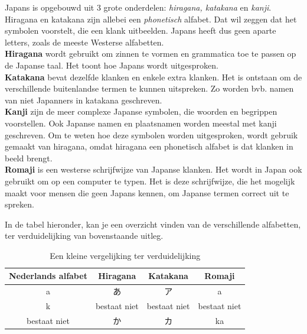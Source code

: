 \documentclass[12pt]{scrartcl}
\begin{document}
\begin{CJK*}{UTF8}{min}
\noindent Japans is opgebouwd uit 3 grote onderdelen: \textit{hiragana, katakana} en \textit{kanji}.\\

\noindent Hiragana en katakana zijn allebei een \textit{phonetisch} alfabet. Dat wil zeggen dat het symbolen voorstelt, die een klank uitbeelden.
Japans heeft dus geen aparte letters, zoals de meeste Westerse alfabetten.\\

\noindent \textbf{Hiragana} wordt gebruikt om zinnen te vormen en grammatica toe te passen op de Japanse taal. Het toont hoe Japans wordt uitgesproken.\\

\noindent \textbf{Katakana} bevat dezelfde klanken en enkele extra klanken. Het is ontstaan om de verschillende buitenlandse termen te kunnen uitspreken. Zo worden bvb. namen van niet Japanners in katakana geschreven.\\

\noindent \textbf{Kanji} zijn de meer complexe Japanse symbolen, die woorden en begrippen voorstellen. Ook Japanse namen en plaatsnamen worden meestal met kanji geschreven. Om te weten hoe deze symbolen worden uitgesproken, wordt gebruik gemaakt van hiragana, omdat hiragana een phonetisch alfabet is dat klanken in beeld brengt.\\

\noindent \textbf{Romaji} is een westerse schrijfwijze van Japanse klanken. Het wordt in Japan ook gebruikt om op een computer te typen.
Het is deze schrijfwijze, die het mogelijk maakt voor mensen die geen Japans kennen, om Japanse termen correct uit te spreken.

\noindent In de tabel hieronder, kan je een overzicht vinden van de verschillende alfabetten, ter verduidelijking van bovenstaande uitleg.\\

\begin{table}[H]
\begin{center}
\begin{tabular}{c|c|c|c}
Nederlands alfabet & Hiragana & Katakana & Romaji\\
\hline
a &  あ & ア & a\\
k & bestaat niet & bestaat niet & bestaat niet\\
bestaat niet & か & カ & ka
\end{tabular}
\end{center}
\caption{Een kleine vergelijking ter verduidelijking}
\label{vergelijking_alfabetten}
\end{table}


\end{CJK*}
\end{document}
